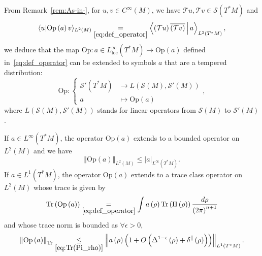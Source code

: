 \documentclass[AHL,Unicode,longabstracts,published]{cedram}
\newcommand{\clS}{\mathcal{S}}
\newcommand{\clT}{\mathcal{T}}
\newcommand{\Opp}{\mathrm{Op}}
\newcommand{\Tr}{\mathrm{Tr}}
\newcommand{\locc}{\mathrm{loc}}
\let\oldforall\forall
\renewcommand*{\forall}{\mathrel{\oldforall}}
\begin{document}
\begin{rema}
From Remark~\ref{rem:As-in-}, for $u,v\in C^{\infty}(M)$, we have $\clT u,\clT v\in\clS(T^{*}M)$ and
\[
\langle u|\Opp\left(a\right)v\rangle_{L^{2}\left(M\right)}\underset{\eqref{eq:def_operator}}{=}\left\langle\left(\clT u\right)\overline{\left(\clT v\right)}\,\middle|\,a\right\rangle_{L^{2}\left(T^{*}M\right)},
\]
we deduce that the map $\Opp:a\in L_{\locc}^{\infty}(T^{*}M)\mapsto\Opp(a)$ defined in~\eqref{eq:def_operator} can be extended to symbols $a$ that are a tempered distribution:
\[
\Opp:
\begin{cases}
\clS'\left(T^{*}M\right) & \rightarrow L\left(\clS\left(M\right),\clS'\left(M\right)\right)\\
a & \mapsto\Opp\left(a\right)
\end{cases},
\]
where $L(\clS(M),\clS'(M))$ stands for linear operators from $\clS(M)$ to $\clS'(M)$.
\end{rema}

\begin{cBoxB}{}
\begin{prop}\label{prop:We-havewhere-}
If $a\in L^{\infty}(T^{*}M)$, the operator $\Opp(a)$ extends to a bounded operator on $L^{2}(M)$ and we have
\begin{equation}
\left\Vert \Opp \left(a\right)\right\Vert _{L^{2}\left(M\right)}\underset{}{\leq}\left|a\right|_{L^{\infty}\left(T^{*}M\right)}.\label{eq:norme_symbol}
\end{equation}
If $a\in L^{1}(T^{*}M)$, the operator $\Opp (a)$ extends to a trace class operator on $L^{2}(M)$ whose trace is given by
\begin{equation}
\Tr\left(\Opp \left(a\right)\right)\underset{\eqref{eq:def_operator}}{=}\int a\left(\rho\right)\Tr\left(\Pi\left(\rho\right)\right)\frac{d\rho}{\left(2\pi\right)^{n+1}}\label{eq:Tr_Opa}
\end{equation}
and whose trace norm is bounded as $\forall\epsilon>0$,
\begin{equation}
\left\Vert \Opp \left(a\right)\right\Vert _{\Tr}\underset{\eqref{eq:Tr(Pi_rho)}}{\leq}\left\Vert a\left(\rho\right)\left(1+O\left(\Delta^{1-\epsilon}\left(\rho\right)+\delta^{\parallel}\left(\rho\right)\right)\right)\right\Vert _{L^{1}\left(T^{*}M\right)}.\label{eq:norm_Tr_Op}
\end{equation}
\end{prop}
\end{cBoxB}
\end{document}
